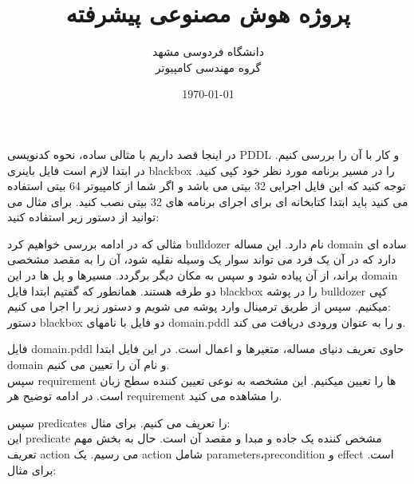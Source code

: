 \documentclass[12pt,onecolumn,a4paper]{article}
\begin{document}
	\title{پروژه هوش مصنوعی پیشرفته} 
	\author{
		دانشگاه فردوسی مشهد\\
		گروه مهندسی کامپیوتر}
	\date{\today}
	\maketitle
	در اینجا قصد داریم با مثالی ساده، نحوه کدنویسی PDDL و کار با آن را بررسی کنیم. در ابتدا لازم است فایل باینری  blackbox را در مسیر برنامه مورد نظر خود کپی کنید. توجه کنید که این فایل اجرایی 32 بیتی می باشد و اگر شما از کامپیوتر 64 بیتی استفاده می کنید باید ابتدا کتابخانه ای برای اجرای برنامه های 32 بیتی نصب کنید. برای مثال می توانید از دستور زیر استفاده کنید:\\
	
	مثالی که در ادامه بررسی خواهیم کرد bulldozer نام دارد. این مساله domain ساده ای دارد که در آن یک فرد می تواند سوار یک وسیله نقلیه شود، آن را به مقصد مشخصی براند، از آن پیاده شود و سپس به مکان دیگر برگردد. مسیرها و پل ها در این domain دو طرفه هستند.
	همانطور که گفتیم ابتدا فایل blackbox را در پوشه bulldozer کپی میکنیم. سپس از طریق ترمینال وارد پوشه می شویم و دستور زیر را اجرا می کنیم:\\
	دستور blackbox دو فایل با نامهای domain.pddl و   را به عنوان ورودی دریافت می کند.
	
	
	فایل domain.pddl حاوی تعریف دنیای مساله، متغیرها و اعمال است. در این فایل ابتدا domain و نام آن را تعیین می کنیم.  \\
	
	سپس requirement ها را تعیین میکنیم.  این مشخصه به نوعی تعیین کننده سطح زبان است. در ادامه توضیح هر requirement را مشاهده می کنید.
	
	سپس predicates را تعریف می کنیم. برای مثال:\\ 
	این predicate مشخص کننده یک جاده و مبدا و مقصد آن است. 
	حال به بخش مهم تعریف action می رسیم. یک action شامل parameters،precondition و  effect است. برای مثال:
	 
	 
\end{document}
